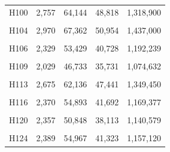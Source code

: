 \documentclass[
  a4paper,
  titlepage]{article}
\begin{document}
\begin{longtable}[t]{lllll}
H100 & 2,757 & 64,144 & 48,818 & 1,318,900\\
 
\cellcolor{gray!6}{H102} & \cellcolor{gray!6}{2,571} & \cellcolor{gray!6}{59,592} & \cellcolor{gray!6}{45,337} & \cellcolor{gray!6}{1,267,760}\\
 
H104 & 2,970 & 67,362 & 50,954 & 1,437,000\\
 
\cellcolor{gray!6}{H105} & \cellcolor{gray!6}{1,897} & \cellcolor{gray!6}{44,750} & \cellcolor{gray!6}{34,142} & \cellcolor{gray!6}{919,432}\\
 
H106 & 2,329 & 53,429 & 40,728 & 1,192,239\\
 
\cellcolor{gray!6}{H108} & \cellcolor{gray!6}{2,080} & \cellcolor{gray!6}{46,738} & \cellcolor{gray!6}{35,441} & \cellcolor{gray!6}{1,019,043}\\
 
H109 & 2,029 & 46,733 & 35,731 & 1,074,632\\
 
\cellcolor{gray!6}{H112} & \cellcolor{gray!6}{2,767} & \cellcolor{gray!6}{63,614} & \cellcolor{gray!6}{48,290} & \cellcolor{gray!6}{1,364,034}\\
 
H113 & 2,675 & 62,136 & 47,441 & 1,349,450\\
 
\cellcolor{gray!6}{H115} & \cellcolor{gray!6}{3,346} & \cellcolor{gray!6}{74,325} & \cellcolor{gray!6}{55,281} & \cellcolor{gray!6}{1,598,462}\\
 
H116 & 2,370 & 54,893 & 41,692 & 1,169,377\\
 
\cellcolor{gray!6}{H117} & \cellcolor{gray!6}{2,939} & \cellcolor{gray!6}{65,468} & \cellcolor{gray!6}{48,839} & \cellcolor{gray!6}{1,329,817}\\
 
H120 & 2,357 & 50,848 & 38,113 & 1,140,579\\
 
\cellcolor{gray!6}{H121} & \cellcolor{gray!6}{2,068} & \cellcolor{gray!6}{48,521} & \cellcolor{gray!6}{37,732} & \cellcolor{gray!6}{1,137,147}\\
 
H124 & 2,389 & 54,967 & 41,323 & 1,157,120\\
 

\end{longtable}
\end{document}
